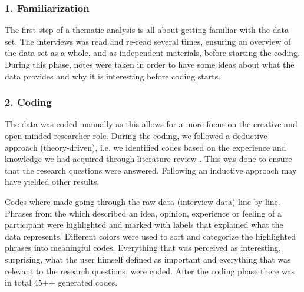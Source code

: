     \subsubsection{1. Familiarization}
    The first step of a thematic analysis is all about getting familiar with the data set. The interviews was read and re-read several times, ensuring an overview of the data set as a whole, and as independent materials, before starting the coding. During this phase, notes were taken in order to have some ideas about what the data provides and why it is interesting before coding starts.
    
    \subsubsection{2. Coding}
    The data was coded manually as this allows for a more focus on the creative and open minded researcher role. 
During the coding, we followed a deductive approach (theory-driven), i.e. we identified codes based on the experience and knowledge we had acquired through literature review \cite{braun_using_2006}. This was done to ensure that the research questions were answered. Following an inductive approach may have yielded other results.
    
Codes where made going through the raw data (interview data) line by line. Phrases from the which described an idea, opinion, experience or feeling of a participant were highlighted and marked with labels that explained what the data represents. Different colors were used to sort and categorize the highlighted phrases into meaningful codes. Everything that was perceived as interesting, surprising, what the user himself defined as important and everything that was relevant to the research questions, were coded. After the coding phase there was in total 45++ generated codes.  
    
